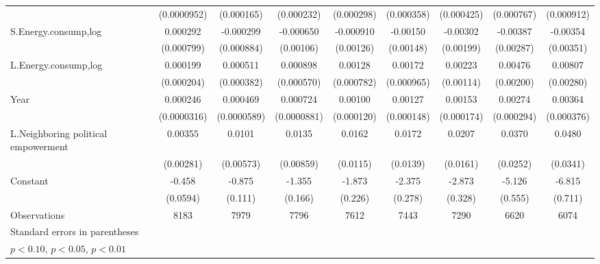 \begin{table}[htbp]
\begin{tabular}{l*{8}{c}}
                    & (0.0000952)         &  (0.000165)         &  (0.000232)         &  (0.000298)         &  (0.000358)         &  (0.000425)         &  (0.000767)         &  (0.000912)         \\
[1em]
S.Energy.consump,log&    0.000292         &   -0.000299         &   -0.000650         &   -0.000910         &    -0.00150         &    -0.00302         &    -0.00387         &    -0.00354         \\
                    &  (0.000799)         &  (0.000884)         &   (0.00106)         &   (0.00126)         &   (0.00148)         &   (0.00199)         &   (0.00287)         &   (0.00351)         \\
[1em]
L.Energy.consump,log&    0.000199         &    0.000511         &    0.000898         &     0.00128         &     0.00172\sym{*}  &     0.00223\sym{*}  &     0.00476\sym{**} &     0.00807\sym{***}\\
                    &  (0.000204)         &  (0.000382)         &  (0.000570)         &  (0.000782)         &  (0.000965)         &   (0.00114)         &   (0.00200)         &   (0.00280)         \\
[1em]
Year                &    0.000246\sym{***}&    0.000469\sym{***}&    0.000724\sym{***}&     0.00100\sym{***}&     0.00127\sym{***}&     0.00153\sym{***}&     0.00274\sym{***}&     0.00364\sym{***}\\
                    & (0.0000316)         & (0.0000589)         & (0.0000881)         &  (0.000120)         &  (0.000148)         &  (0.000174)         &  (0.000294)         &  (0.000376)         \\
[1em]
L.Neighboring political empowerment&     0.00355         &      0.0101\sym{*}  &      0.0135         &      0.0162         &      0.0172         &      0.0207         &      0.0370         &      0.0480         \\
                    &   (0.00281)         &   (0.00573)         &   (0.00859)         &    (0.0115)         &    (0.0139)         &    (0.0161)         &    (0.0252)         &    (0.0341)         \\
[1em]
Constant            &      -0.458\sym{***}&      -0.875\sym{***}&      -1.355\sym{***}&      -1.873\sym{***}&      -2.375\sym{***}&      -2.873\sym{***}&      -5.126\sym{***}&      -6.815\sym{***}\\
                    &    (0.0594)         &     (0.111)         &     (0.166)         &     (0.226)         &     (0.278)         &     (0.328)         &     (0.555)         &     (0.711)         \\
\hline
Observations        &        8183         &        7979         &        7796         &        7612         &        7443         &        7290         &        6620         &        6074         \\
\hline\hline
\multicolumn{9}{l}{\footnotesize Standard errors in parentheses}\\
\multicolumn{9}{l}{\footnotesize \sym{*} \(p<0.10\), \sym{**} \(p<0.05\), \sym{***} \(p<0.01\)}\\
\end{tabular}
\end{table}
